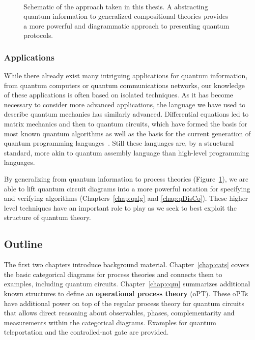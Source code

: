 \begin{figure}[t]
\begin{align*}

\end{align*}
\caption[Schematic of generalized compositional theories and categorical diagrams.]{Schematic of the approach taken in this thesis. A abstracting quantum information to generalized compositional theories provides a more powerful and diagrammatic approach to presenting quantum protocols.}
\label{fig:overview}
\end{figure}


\subsubsection*{Applications} While there already exist many intriguing applications for quantum information, from quantum computers or quantum communications networks, our knowledge of these applications is often based on isolated techniques. As it has become necessary to consider more advanced applications, the language we have used to describe quantum mechanics has similarly advanced. Differential equations led to matrix mechanics and then to quantum circuits, which have formed the basis for most known quantum algorithms as well as the basis for the current generation of quantum programming languages~\cite{green2013quipper,wecker2014liqui}. Still these languages are, by a structural standard, more akin to quantum assembly language than high-level programming languages. 

By generalizing from quantum information to process theories (Figure~\ref{fig:overview}), we are able to lift quantum circuit diagrams into a more powerful notation for specifying and verifying algorithms (Chapters~\ref{chap:qalg} and \ref{chap:qDisCo}). These higher level techniques have an important role to play as we seek to best exploit the structure of quantum theory. 

\subsection*{Outline}

The first two chapters introduce background material. Chapter~\ref{chap:cats} covers the basic categorical diagrams for process theories and connects them to examples, including quantum circuits. Chapter~\ref{chap:cqm} summarizes additional known structures to define an \textbf{operational process theory} (oPT). These oPTs have additional power on top of the regular process theory for quantum circuits that allows direct reasoning about observables, phases, complementarity and measurements within the categorical diagrams. Examples for quantum teleportation and the controlled-not gate are provided.

